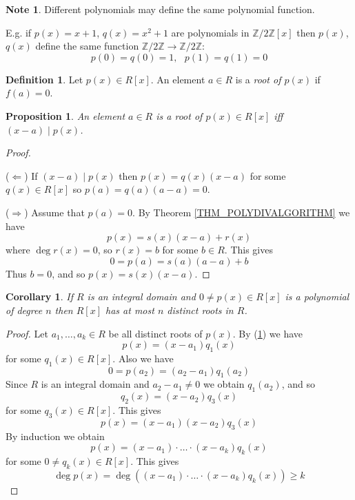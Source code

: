 \documentclass[12pt, letterpaper, oneside]{article}
\theoremstyle{plain}
\newtheorem{proposition}[theorem]{Proposition}
\newtheorem{corollary}[theorem]{Corollary}
\theoremstyle{definition}
\newtheorem{definition}[theorem]{Definition}
\newtheorem{note}[theorem]{Note}
\newcommand{\Z}{{\mathbb Z}}
\newcommand{\vs}{\vskip 5mm}
\begin{document}
 
\vs\vs

\begin{note}
Different polynomials may define the same polynomial function. 

E.g. if  $p(x)=x+1$, $q(x)= x^{2}+1$ are polynomials in $\Z/2\Z[x]$ then 
$p(x)$, $q(x)$ define the same function $\Z/2\Z \to \Z/2\Z$:
$$p(0) = q(0) = 1, \ \ \ p(1)= q(1)= 0$$
\end{note} 


\vs\vs

\begin{definition}
Let $p(x)\in R[x]$. An element $a\in R$ is a \emph{root of $p(x)$} if $f(a)=0$.
\end{definition}
 
 
\vs\vs\vs


\begin{proposition}
\label{PROP_ROOTDIVISION}
An element $a\in R$ is a root of $p(x)\in R[x]$ iff $(x-a) \mid p(x)$.
\end{proposition} 
 
\vs

\begin{proof} \ 
 
($\Leftarrow$) If $(x-a)\mid p(x)$ then $p(x) = q(x)(x-a)$ for some $q(x)\in R[x]$
so $p(a) = q(a)(a-a) = 0$.

($\Rightarrow$) Assume that $p(a)=0$. By Theorem \ref{THM_POLYDIVALGORITHM} we have 
$$p(x) = s(x)(x-a) + r(x)$$
where $\deg r(x) = 0$, so $r(x) = b$ for some $b\in R$. This gives 
$$0 = p(a) = s(a)(a-a) +b$$
Thus $b=0$, and so $p(x) = s(x)(x-a)$. 

\end{proof} 
 
\vs\vs 

\begin{corollary}
\label{COR_POLYROOTNUMBER}
If $R$ is an integral domain and $0\neq p(x)\in R[x]$ is a polynomial of degree $n$ then $R[x]$ 
has at most $n$ distinct roots in $R$. 
\end{corollary}
 
 
\vs 


\begin{proof}
Let $a_{1}, \dots, a_{k}\in R$ be all distinct roots of $p(x)$. By (\ref{PROP_ROOTDIVISION})
we have 
$$p(x) = (x-a_{1})q_{1}(x)$$
for some $q_{1}(x)\in R[x]$. Also we have 
$$0 = p(a_{2}) = (a_{2}-a_{1})q_{1}(a_{2})$$
Since $R$ is an integral domain and $a_{2}-a_{1} \neq 0$ we obtain $q_{1}(a_{2})$, and so 
$$q_{2}(x)= (x-a_{2})q_{3}(x)$$ 
for some $q_{3}(x)\in R[x]$.  This gives 
$$p(x) = (x-a_{1})(x-a_{2})q_{3}(x)$$
By induction we obtain 
$$p(x) = (x-a_{1})\cdot{\dots}{\cdot}(x-a_{k})q_{k}(x)$$
for some $0\neq q_{k}(x)\in R[x]$. This gives
$$\deg p(x) = \deg  ((x-a_{1})\cdot{\dots}{\cdot}(x-a_{k})q_{k}(x)) \geq k$$
\end{proof} 
 
\end{document}

